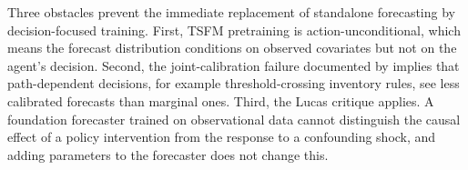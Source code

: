 Three obstacles prevent the immediate replacement of standalone forecasting by
decision-focused training. First, TSFM pretraining is action-unconditional, which
means the forecast distribution conditions on observed covariates but not on the
agent's decision. Second, the joint-calibration failure documented by
\citet{PerezDiaz2025} implies that path-dependent decisions, for example
threshold-crossing inventory rules, see less calibrated forecasts than marginal
ones. Third, the Lucas critique applies. A foundation forecaster trained on
observational data cannot distinguish the causal effect of a policy intervention
from the response to a confounding shock, and adding parameters to the forecaster
does not change this.
